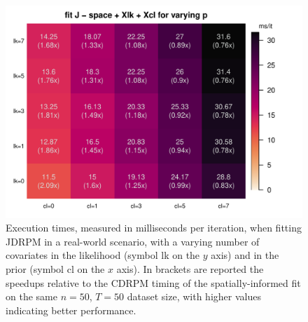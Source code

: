 \documentclass[12pt,	%
	a4paper,		%
	twoside,		%
	openright,		%
	titlepage,%
	]{book}
\theoremstyle{definition}
\begin{document}

\begin{figure}[!ht]
    \centering
    \includegraphics[width=0.8\linewidth]{Testing/Scaling possibilities/test_varying_p.pdf}
    \caption[Execution times of JDRPM, with covariates information, varying $p$]{Execution times, measured in milliseconds per iteration, when fitting JDRPM in a real-world scenario, with a varying number of covariates in the likelihood (symbol lk on the $y$ axis) and in the prior (symbol cl on the $x$ axis). In brackets are reported the speedups relative to the CDRPM timing of the spatially-informed fit on the same $n=50$, $T=50$ dataset size, with higher values indicating better performance.}
    \label{fig: test varying p}
\end{figure}
\end{document}
